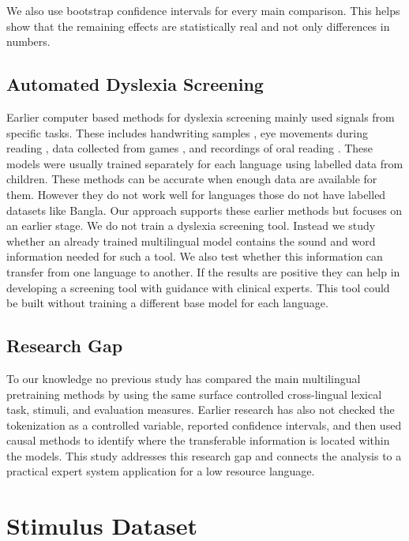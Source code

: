 \documentclass[preprint,12pt,authoryear]{elsarticle}
\begin{document}
We also use bootstrap confidence intervals \citep{efron1994bootstrap} for every main comparison. This helps show that the remaining effects are statistically real and not only differences in numbers.

\subsection{Automated Dyslexia Screening}
Earlier computer based methods for dyslexia screening mainly used signals from specific tasks. These includes handwriting samples \citep{spoon2019handwriting}, eye movements during reading \citep{benfatto2016eyetracking}, data collected from games \citep{rello2020gamified}, and recordings of oral reading \citep{tas2023audio}. These models were usually trained separately for each language using labelled data from children.
These methods can be accurate when enough data are available for them. However they do not work well for languages those do not have labelled datasets like Bangla.
Our approach supports these earlier methods but focuses on an earlier stage. We do not train a dyslexia screening tool. Instead we study whether an already trained multilingual model contains the sound and word information needed for such a tool. We also test whether this information can transfer from one language to another.
If the results are positive they can help in developing a screening tool with guidance with clinical experts. This tool could be built without training a different base model for each language.

\subsection{Research Gap}
To our knowledge no previous study has compared the main multilingual pretraining methods by using the same surface controlled cross-lingual lexical task, stimuli, and evaluation measures. Earlier research has also not checked the tokenization as a controlled variable, reported confidence intervals, and then used causal methods to identify where the transferable information is located within the models. This study addresses this research gap and connects the analysis to a practical expert system application for a low resource language.

\section{Stimulus Dataset}
\label{sec:data}
\end{document}

